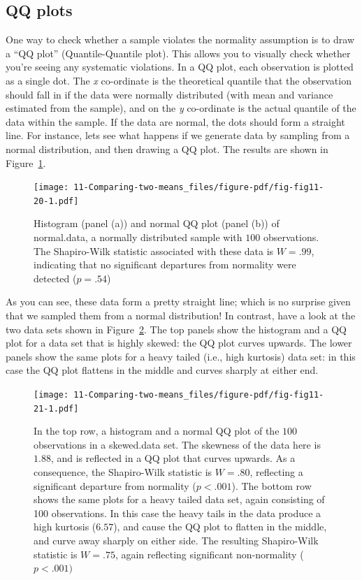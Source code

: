 \documentclass[
  a4paper,
]{book}
\begin{document}
\hypertarget{qq-plots}{%
\subsection{QQ plots}\label{qq-plots}}

One way to check whether a sample violates the normality assumption is
to draw a ``QQ plot'' (Quantile-Quantile plot). This allows you to
visually check whether you're seeing any systematic violations. In a QQ
plot, each observation is plotted as a single dot. The \emph{x}
co-ordinate is the theoretical quantile that the observation should fall
in if the data were normally distributed (with mean and variance
estimated from the sample), and on the \emph{y} co-ordinate is the
actual quantile of the data within the sample. If the data are normal,
the dots should form a straight line. For instance, lets see what
happens if we generate data by sampling from a normal distribution, and
then drawing a QQ plot. The results are shown in
Figure~\ref{fig-fig11-20}.

\begin{figure}

\texttt{[image: 11-Comparing-two-means\_files/figure-pdf/fig-fig11-20-1.pdf]} \hfill{}

\caption{\label{fig-fig11-20}Histogram (panel (a)) and normal QQ plot
(panel (b)) of normal.data, a normally distributed sample with \(100\)
observations. The Shapiro-Wilk statistic associated with these data is
\(W = .99\), indicating that no significant departures from normality
were detected (\(p = .54\))}

\end{figure}

As you can see, these data form a pretty straight line; which is no
surprise given that we sampled them from a normal distribution! In
contrast, have a look at the two data sets shown in
Figure~\ref{fig-fig11-21}. The top panels show the histogram and a QQ
plot for a data set that is highly skewed: the QQ plot curves upwards.
The lower panels show the same plots for a heavy tailed (i.e., high
kurtosis) data set: in this case the QQ plot flattens in the middle and
curves sharply at either end.

\begin{figure}

\texttt{[image: 11-Comparing-two-means\_files/figure-pdf/fig-fig11-21-1.pdf]} \hfill{}

\caption{\label{fig-fig11-21}In the top row, a histogram and a normal QQ
plot of the \(100\) observations in a skewed.data set. The skewness of
the data here is \(1.88\), and is reflected in a QQ plot that curves
upwards. As a consequence, the Shapiro-Wilk statistic is \(W = .80\),
reflecting a significant departure from normality (\(p< .001\)). The
bottom row shows the same plots for a heavy tailed data set, again
consisting of 100 observations. In this case the heavy tails in the data
produce a high kurtosis (\(6.57\)), and cause the QQ plot to flatten in
the middle, and curve away sharply on either side. The resulting
Shapiro-Wilk statistic is \(W = .75\), again reflecting significant
non-normality (\(p<.001)\)}

\end{figure}
\end{document}
